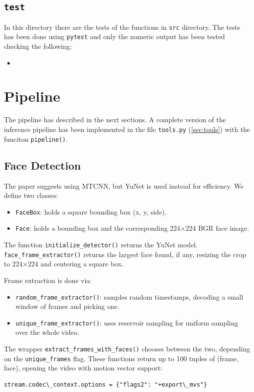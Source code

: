 \documentclass[a4paper,12pt]{article}
\begin{document}
\subsection{\texttt{test}}
In this directory there are the tests of the functions in \texttt{src} directory. The tests has been done using \texttt{pytest} and only the numeric output has been tested checking the following:
\begin{itemize}
    \item %
\end{itemize}

\section{Pipeline}
\label{sec:pipeline}

The pipeline has described in the next sections. A complete version of the inference pipeline has been implemented in the file \texttt{tools.py} (\ref{sec:tools}) with the funciton \texttt{pipeline()}.
\subsection{Face Detection}

The paper suggests using MTCNN, but YuNet is used instead for efficiency. We define two classes:
\begin{itemize}
  \item \texttt{FaceBox}: holds a square bounding box (x, y, side).
  \item \texttt{Face}: holds a bounding box and the corresponding 224×224 BGR face image.
\end{itemize}

The function \texttt{initialize\_detector()} returns the YuNet model. \texttt{face\_frame\_extractor()} returns the largest face found, if any, resizing the crop to 224×224 and centering a square box.

Frame extraction is done via:
\begin{itemize}
  \item \texttt{random\_frame\_extractor()}: samples random timestamps, decoding a small window of frames and picking one.
  \item \texttt{unique\_frame\_extractor()}: uses reservoir sampling for uniform sampling over the whole video.
\end{itemize}

The wrapper \texttt{extract\_frames\_with\_faces()} chooses between the two, depending on the \texttt{unique\_frames} flag. These functions return up to 100 tuples of (frame, face), opening the video with motion vector support:
\begin{lstlisting}
stream.codec\_context.options = {"flags2": "+export\_mvs"}
\end{lstlisting}
\end{document}
